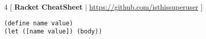 \documentclass{article}
\begin{document}
\begin{multicols*}{4}
[
\textbf{Racket CheatSheet} | \href{https://github.com/isthissuperuser}{https://github.com/isthissuperuser}
]

\begin{lstlisting}
(define name value)
(let ([name value]) (body))
\end{lstlisting}

\end{multicols*}
\end{document}
